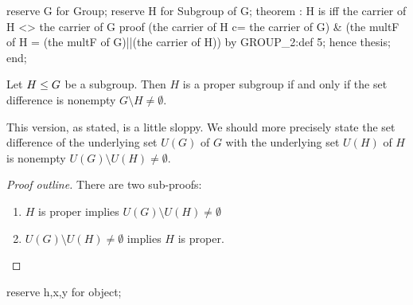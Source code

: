 \nwenddocs{}\endmoddef\nwstartdeflinemarkup{}\nwenddeflinemarkup
reserve G for Group;
reserve H for Subgroup of G;
theorem :
  H is  iff the carrier of H <> the carrier of G
proof
  (the carrier of H c= the carrier of G) & (the multF of H =
  (the multF of G)||(the carrier of H)) by GROUP_2:def 5;
  hence thesis;
end;
\eatline
{}\nwendcode{}\nwdocspar
\begin{theorem}\label{thm:characteristic:preparatory:proper-subgroups-have-set-diff-neq-empty}
  Let $H\leq G$ be a subgroup.
  Then $H$ is a proper subgroup if and only if the set difference is nonempty
  $G\setminus H\neq\emptyset$.
\end{theorem}

\begin{thm-remark}
This version, as stated, is a little sloppy. We should more precisely
state the set difference of the underlying set $U(G)$ of $G$ with the
underlying set $U(H)$ of $H$ is nonempty $U(G)\setminus U(H)\neq\emptyset$.
\end{thm-remark}

\begin{proof}[Proof outline]
  There are two sub-proofs:
  \begin{enumerate}
  \item $H$ is proper implies $U(G)\setminus U(H)\neq\emptyset$
  \item $U(G)\setminus U(H)\neq\emptyset$ implies $H$ is proper.\qedhere
  \end{enumerate}
\end{proof}

\nwenddocs{}\endmoddef\nwstartdeflinemarkup{}\nwenddeflinemarkup
reserve h,x,y for object;

